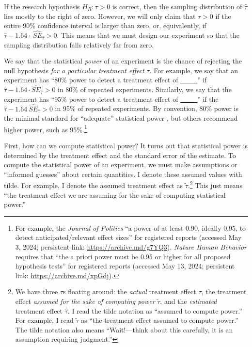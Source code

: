 \documentclass[12pt]{article}
\begin{document}
If the research hypothesis $H_{R}:\tau > 0$ is correct, then the sampling distribution of $\widehat{\tau}$ lies mostly to the right of zero. 
However, we will only claim that $\tau > 0$ if the entire 90\% confidence interval is larger than zero, or, equivalently, if $\widehat{\tau} - 1.64 \cdot \ {\widehat{SE}}_{\widehat{\tau}} > 0.$
This means that we must design our experiment so that the sampling distribution falls relatively far from zero.

We say that the statistical \emph{power} of an experiment is the chance of rejecting the null hypothesis \emph{for a particular treatment effect} $\tau$. 
For example, we say that an experiment has ``80\% power to detect a treatment effect of \underline{~~~~~}'' if
$\widehat{\tau} - 1.64 \cdot {\widehat{SE}}_{\widehat{\tau}} > 0$ in 80\% of repeated experiments.
Similarly, we say that the experiment has ``95\% power to detect a treatment effect of \underline{~~~~~}'' if the $\widehat{\tau} - 1.64\ {\widehat{SE}}_{\widehat{\tau}} > 0$ in 95\% of repeated experiments. 
By convention, 80\% power is the minimal standard for ``adequate'' statistical power \citep{Cohen1988}, but others recommend higher power, such as 95\%.\footnote{
  For example, the \textit{Journal of Politics} ``a power of at least 0.90, ideally 0.95, to detect anticipated/relevant effect sizes'' for registered reports (accessed May 3, 2024; persistent link: \url{https://archive.md/g7YQ3}). 
  \textit{Nature Human Behavior} requires that ``the a priori power must be 0.95 or higher for all proposed hypothesis tests'' for registered reports (accessed May 13, 2024; persistent link: \url{https://archive.md/xpGdj}).
  }

First, how can we compute statistical power? 
It turns out that statistical power is determined by the treatment effect and the
standard error of the estimate. 
To compute the statistical power of an experiment, we must make assumptions or ``informed guesses'' about certain quantities. 
I denote these assumed values with tilde. For example, I denote the assumed treatment effect as $\widetilde{\tau}$.\footnote{
  We have three $\tau$s floating around: the \emph{actual} treatment effect $\tau$, the treatment effect \emph{assumed for the sake of computing power} $\widetilde{\tau}$, and the \emph{estimated} treatment effect $\widehat{\tau}$. 
  I read the tilde notation as ``assumed to compute power.'' 
  For example, I read $\widetilde{\tau}$ as ``the treatment effect assumed
  to compute power.'' 
  The tilde notation also means ``Wait!---think about this carefully, it is an assumption requiring judgment.''}
This just means ``the treatment effect we are assuming for the sake of computing statistical power.''
\end{document}
